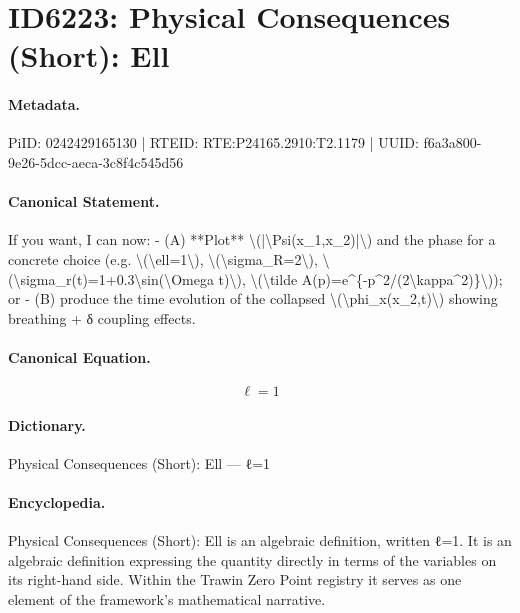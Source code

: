 \section*{ID6223: Physical Consequences (Short): Ell}
\paragraph{Metadata.}
PiID: 0242429165130 | RTEID: RTE:P24165.2910:T2.1179 | UUID: f6a3a800-9e26-5dcc-aeca-3c8f4c545d56

\paragraph{Canonical Statement.}
If you want, I can now: - (A) **Plot** \textbackslash{}(|\textbackslash{}Psi(x\_1,x\_2)|\textbackslash{}) and the phase for a concrete choice (e.g. \textbackslash{}(\textbackslash{}ell=1\textbackslash{}), \textbackslash{}(\textbackslash{}sigma\_R=2\textbackslash{}), \textbackslash{}(\textbackslash{}sigma\_r(t)=1+0.3\textbackslash{}sin(\textbackslash{}Omega t)\textbackslash{}), \textbackslash{}(\textbackslash{}tilde A(p)=e\textasciicircum{}\{-p\textasciicircum{}2/(2\textbackslash{}kappa\textasciicircum{}2)\}\textbackslash{})); or - (B) produce the time evolution of the collapsed \textbackslash{}(\textbackslash{}phi\_x(x\_2,t)\textbackslash{}) showing breathing + δ coupling effects.

\paragraph{Canonical Equation.}
\[
\ell=1
\]

\paragraph{Dictionary.}
Physical Consequences (Short): Ell — ℓ=1

\paragraph{Encyclopedia.}
Physical Consequences (Short): Ell is an algebraic definition, written ℓ=1. It is an algebraic definition expressing the quantity directly in terms of the variables on its right-hand side. Within the Trawin Zero Point registry it serves as one element of the framework's mathematical narrative.
